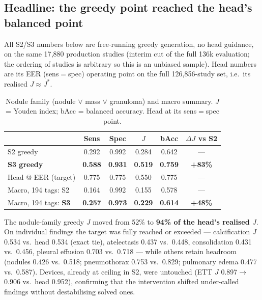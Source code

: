 \documentclass[10pt,a4paper]{article}
\begin{document}
\subsection{Headline: the greedy point reached the head's balanced point}

All S2/S3 numbers below are free-running greedy generation, no head guidance, on the
same 17{,}880 production studies (interim cut of the full 136k evaluation; the ordering
of studies is arbitrary so this is an unbiased sample). Head numbers are its EER
(sens$=$spec) operating point on the full 126{,}856-study set, i.e.\ its realised
$J\!\approx\!J^{*}$.

\begin{table}[h]
\centering\small
\caption{Nodule family (nodule $\lor$ mass $\lor$ granuloma) and macro summary.
$J$ = Youden index; bAcc = balanced accuracy. Head at its sens$=$spec point.}
\begin{tabular}{lccccc}
\toprule
 & Sens & Spec & $J$ & bAcc & $\Delta J$ vs S2 \\
\midrule
S2 greedy            & 0.292 & 0.992 & 0.284 & 0.642 & --- \\
\textbf{S3 greedy}   & \textbf{0.588} & \textbf{0.931} & \textbf{0.519} & \textbf{0.759} & \textbf{+83\%} \\
Head @ EER (target)  & 0.775 & 0.775 & 0.550 & 0.775 & --- \\
\midrule
Macro, 194 tags: S2  & 0.164 & 0.992 & 0.155 & 0.578 & --- \\
Macro, 194 tags: \textbf{S3} & \textbf{0.257} & \textbf{0.973} & \textbf{0.229} & \textbf{0.614} & \textbf{+48\%} \\
\bottomrule
\end{tabular}
\end{table}

The nodule-family greedy $J$ moved from 52\% to \textbf{94\% of the head's realised
$J$}. On individual findings the target was fully reached or exceeded --- calcification
$J$ 0.534 vs.\ head 0.534 (exact tie), atelectasis 0.437 vs.\ 0.448, consolidation
0.431 vs.\ 0.456, pleural effusion 0.703 vs.\ 0.718 --- while others retain headroom
(nodules 0.426 vs.\ 0.518; pneumothorax 0.753 vs.\ 0.829; pulmonary edema 0.477 vs.\
0.587). Devices, already at ceiling in S2, were untouched (ETT $J$ 0.897$\to$0.906 vs.\
head 0.952), confirming that the intervention shifted under-called findings without
destabilising solved ones.
\end{document}
